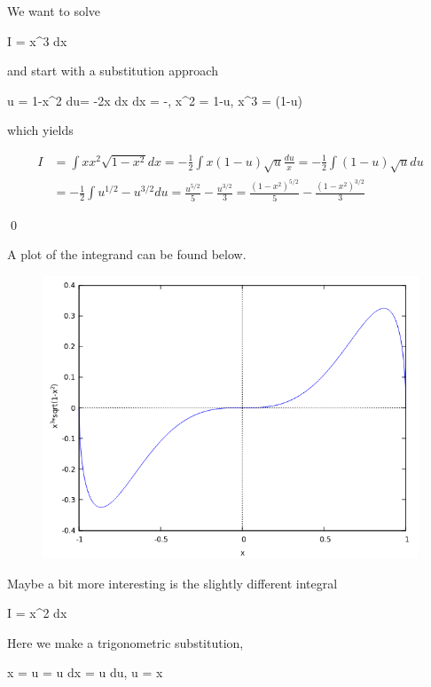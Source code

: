 
We want to solve

\bee
I = \int x^3  dx
\eee

and start with a substitution approach

\bee
u = 1-x^2 \rightarrow du=  -2x dx \rightarrow dx = -, x^2 = 1-u, x^3 = (1-u) 
\eee

which yields

\begin{align*}
I &= \int x x^2 \sqrt{1-x^2} dx = - \frac{1}{2} \int x (1-u) \sqrt{u} \frac{du}{x} = - \frac{1}{2} \int (1-u) \sqrt{u} du \\ &= - \frac{1}{2} \int u^{1/2} - u^{3/2} du = \frac{u^{5/2}}{5} - \frac{u^{3/2}}{3} = \frac{(1-x^2)^{5/2}}{5} - \frac{(1-x^2)^{3/2}}{3}
\end{align*}

\qed

A plot of the integrand can be found below.

\begin{figure}[hbt!]
\centering
\includegraphics[scale=0.5]{images/interesting_integrals_08_1.png}
\end{figure}




Maybe a bit more interesting is the slightly different integral

\bee
I = \int x^2  dx
\eee

Here we make a trigonometric substitution,

\bee
x = \sin u \rightarrow {} = \cos u \rightarrow dx = \cos u du, u = \arcsin x
\eee

